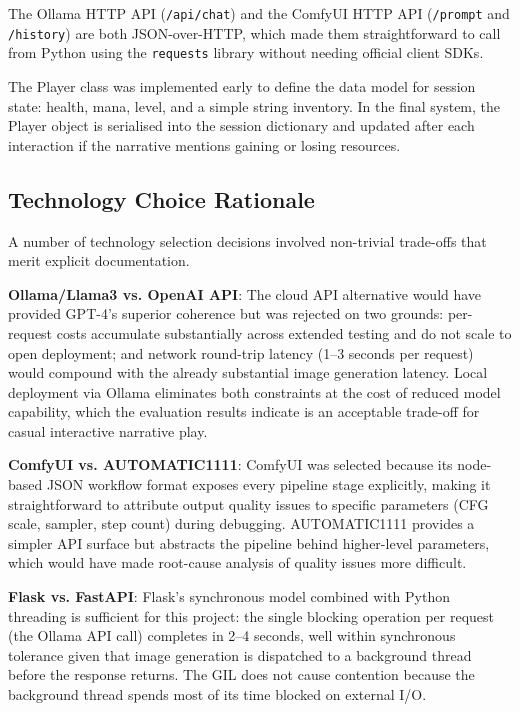 \documentclass[12pt,a4paper]{article}
\begin{document}
The Ollama HTTP API (\texttt{/api/chat}) and the ComfyUI HTTP API (\texttt{/prompt} and \texttt{/history}) are both JSON-over-HTTP, which made them straightforward to call from Python using the \texttt{requests} library without needing official client SDKs.

The Player class was implemented early to define the data model for session state: health, mana, level, and a simple string inventory. In the final system, the Player object is serialised into the session dictionary and updated after each interaction if the narrative mentions gaining or losing resources.

\subsection{Technology Choice Rationale}

A number of technology selection decisions involved non-trivial trade-offs that merit explicit documentation.

\textbf{Ollama/Llama3 vs. OpenAI API}: The cloud API alternative would have provided GPT-4's superior coherence but was rejected on two grounds: per-request costs accumulate substantially across extended testing and do not scale to open deployment; and network round-trip latency (1--3 seconds per request) would compound with the already substantial image generation latency. Local deployment via Ollama eliminates both constraints at the cost of reduced model capability, which the evaluation results indicate is an acceptable trade-off for casual interactive narrative play.

\textbf{ComfyUI vs. AUTOMATIC1111}: ComfyUI was selected because its node-based JSON workflow format exposes every pipeline stage explicitly, making it straightforward to attribute output quality issues to specific parameters (CFG scale, sampler, step count) during debugging. AUTOMATIC1111 provides a simpler API surface but abstracts the pipeline behind higher-level parameters, which would have made root-cause analysis of quality issues more difficult.

\textbf{Flask vs. FastAPI}: Flask's synchronous model combined with Python threading is sufficient for this project: the single blocking operation per request (the Ollama API call) completes in 2--4 seconds, well within synchronous tolerance given that image generation is dispatched to a background thread before the response returns. The GIL does not cause contention because the background thread spends most of its time blocked on external I/O.
\end{document}
